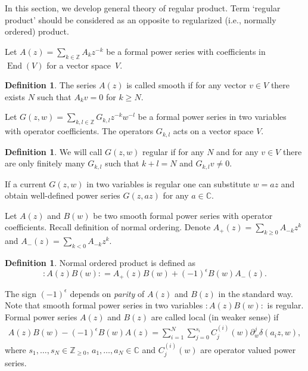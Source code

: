 \documentclass[pdftex]{sigma}
\numberwithin{equation}{section}
\theoremstyle{definition}
\newtheorem{Definition}[Theorem]{Definition}
\DeclareMathOperator{\End}{End}
\begin{document}
In this section, we develop general theory of regular product. Term `regular product' should be considered as an opposite to regularized (i.e., normally ordered) product.

Let $A(z) = \sum\limits_{k \in \mathbb{Z}} A_k z^{-k}$ be a formal power series with coefficients in $\End(V)$ for a vector space~$V$.
\begin{Definition}
The series $A(z)$ is called smooth if for any vector $v \in V$ there exists $N$ such that $A_k v = 0$ for $k \geqslant N$.
\end{Definition}
Let $G(z,w) = \sum\limits_{k,l \in \mathbb{Z}}G_{k,l} z^{-k} w^{-l}$ be a formal power series in two variables with operator coefficients. The operators $G_{k,l}$ acts on a vector space $V$.
\begin{Definition} \label{def:regular}
We will call $G(z,w)$ regular if for any $N$ and for any $v \in V$ there are only finitely many $G_{k,l}$ such that $k+l=N$ and $G_{k,l} v \neq 0$.
\end{Definition}

If a current $G(z,w)$ in two variables is regular one can substitute $w=az$ and obtain well-defined power series $G(z, az)$ for any $a \in \mathbb{C}$.

Let $A(z)$ and $B(w)$ be two smooth formal power series with operator coefficients. Recall definition of normal ordering. Denote $A_+ (z) = \sum\limits_{k \geqslant 0} A_{-k} z^{k}$ and $A_- (z) = \sum\limits_{k < 0} A_{-k} z^{k}$.

\begin{Definition} \label{def:norm}
Normal ordered product is defined as
\[ {: \! A(z) B(w) \! :} = A_+ (z) B(w) + (-1)^{\epsilon} B(w) A_- (z).\]
\end{Definition}

The sign $(-1)^{\epsilon}$ depends on \emph{parity} of $A(z)$ and $B(z)$ in the standard way. Note that smooth formal power series in two variables $: \! A(z) B(w) \! :$ is regular. Formal power series $A(z)$ and $B(z)$ are called local (in weaker sense) if
\begin{gather} \label{def:weakLocal}
A(z)B(w)-(-1)^{\epsilon} B(w) A(z) = \sum_{i=1}^{N} \sum_{j=0}^{s_i} C_{j}^{(i)} (w) \partial_w^j \delta(a_i z, w),
\end{gather}
where $s_1, \dots, s_N \in \mathbb{Z}_{\geq 0}$, $a_1, \dots, a_N \in \mathbb{C}$ and $C_{j}^{(i)} \! (w)$ are operator valued power series.
\end{document}

